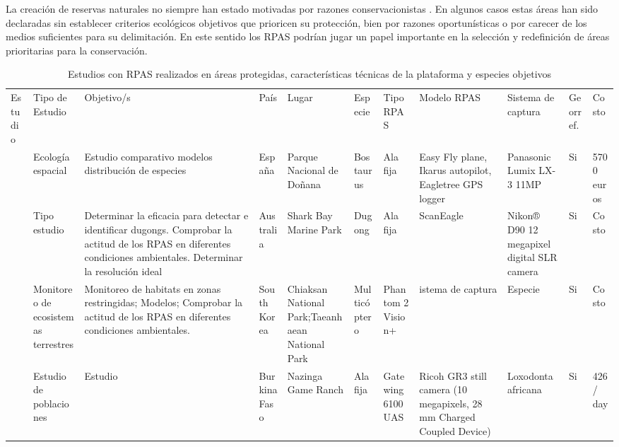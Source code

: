 \documentclass[11pt,]{article}
\begin{document}
La creación de reservas naturales no siempre han estado motivadas por
razones conservacionistas \citep{Knight2007}. En algunos casos estas
áreas han sido declaradas sin establecer criterios ecológicos objetivos
que prioricen su protección, bien por razones oportunísticas o por
carecer de los medios suficientes para su delimitación. En este sentido
los RPAS podrían jugar un papel importante en la selección y
redefinición de áreas prioritarias para la conservación.

\begin{sidewaystable}
\centering
\captionsetup{font=scriptsize,labelfont=scriptsize}
\caption{Estudios con RPAS realizados en áreas protegidas, características técnicas de la plataforma y especies objetivos}
\label{my-label}
\tiny
\begin{tabular}{p{2.5cm}p{1cm}p{3cm}p{1cm}p{2cm}p{2cm}p{1cm}p{2cm}p{2cm}p{1cm}p{0.5cm}}
\cmidrule(r){1-11}

Estudio & Tipo de Estudio & Objetivo/s & País & Lugar & Especie & Tipo RPAS & Modelo RPAS & Sistema de captura & Georref. & Costo \\ \cmidrule(r){1-11}

\cite{PazmanyMulero2015}  & Ecología espacial & Estudio comparativo modelos distribución de especies & España & Parque Nacional de Doñana & Bos taurus  & Ala fija & Easy Fly plane, Ikarus autopilot, Eagletree GPS logger & Panasonic Lumix LX-3 11MP & Si & 5700 euros \\ 

\citealt{Hodgson2013} & Tipo estudio & Determinar la eficacia para detectar e identificar dugongs.  Comprobar la actitud de los RPAS en diferentes condiciones ambientales. Determinar la resolución ideal  & Australia & Shark Bay Marine Park & Dugong & Ala fija &  ScanEagle & Nikon® D90 12 megapixel digital SLR camera  & Si & Costo  \\ 

\cite{Ivosevic2015}  & Monitoreo de ecosistemas terrestres & Monitoreo de habitats en zonas restringidas; Modelos; Comprobar la actitud de los RPAS en diferentes condiciones ambientales. & South Korea & Chiaksan National Park;Taeanhaean National Park & Multicóptero & Phantom 2 Vision+ & istema de captura & Especie & Si & Costo \\ 

\cite{Vermeulen2013}  & Estudio de poblaciones & Estudio &  Burkina Faso & Nazinga Game Ranch & Ala fija  &  Gatewing 6100 UAS & Ricoh GR3 still camera (10 megapixels, 28 mm Charged Coupled Device) & Loxodonta africana & Si & 426 / day \\ 


\end{tabular}
\end{sidewaystable}
\end{document}
